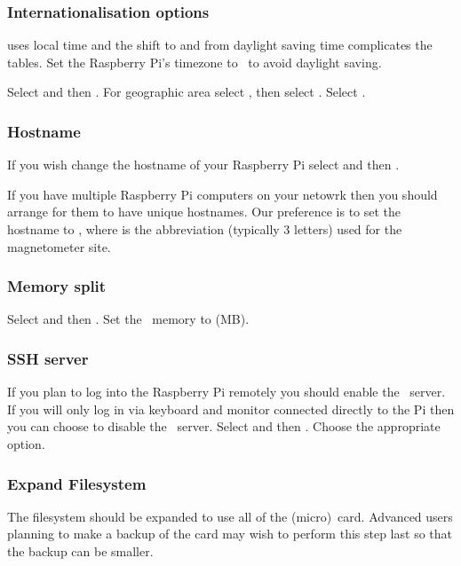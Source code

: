 \subsubsection{Internationalisation options}
 uses local time and the shift to and from daylight
saving time complicates the  tables. Set the Raspberry
Pi's timezone to \utc\ to avoid daylight saving.

Select  and
then . For geographic area select %
, then select \code{\utc}. Select .

\subsubsection{Hostname} 

If you wish change the hostname of your Raspberry Pi select
 and then .

If you have multiple Raspberry Pi computers on your netowrk then you
should arrange for them to have unique hostnames. Our preference is to
set the hostname to , where  is the
abbreviation (typically 3 letters) used for the magnetometer site.

\subsubsection{Memory split}
Select  and then . Set the \gpu\ memory to  (MB).

\subsubsection{SSH server}
If you plan to log into the Raspberry Pi remotely you should enable
the \ssh\ server. If you will only log in via keyboard and monitor
connected directly to the Pi then you can choose to disable the \ssh\
server.
Select  and then . Choose the
appropriate option.

\subsubsection{Expand Filesystem}
The filesystem should be expanded to use all of the (micro)\sd\
card. Advanced users planning to make a backup of the card may wish to
perform this step last so that the backup can be smaller.


